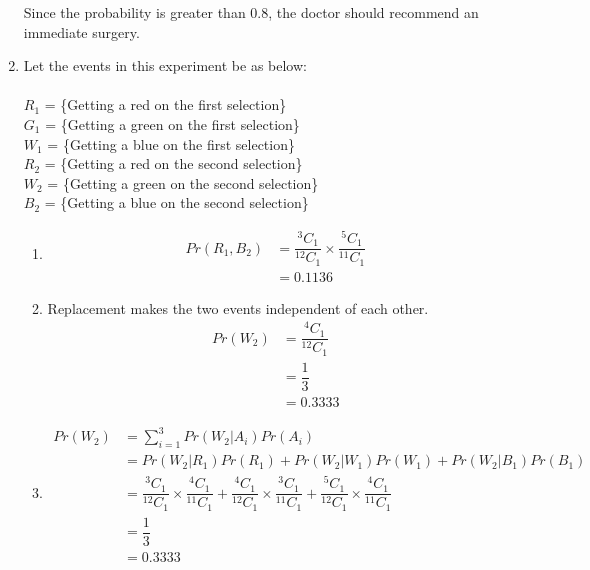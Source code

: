 \documentclass{article}
\begin{document}
\begin{enumerate}
		Since the probability is greater than 0.8, the doctor should recommend an immediate surgery.
		
		\newpage
		
		\item \large Let the events in this experiment be as below:
		\\\\
		$R_{1}$ = \{Getting a red on the first selection\}\\
		$G_{1}$ = \{Getting a green on the first selection\}\\
		$W_{1}$ = \{Getting a blue on the first selection\}\\
		$R_{2}$ = \{Getting a red on the second selection\}\\
		$W_{2}$ = \{Getting a green on the second selection\}\\
		$B_{2}$ = \{Getting a blue on the second selection\}
		\begin{enumerate}
			\item
			 \begin{align*}
			 	Pr(R_{1}, B_{2}) &= \dfrac{^{3}C_{1}}{^{12}C_{1}} \times \dfrac{^{5}C_{1}}{^{11}C_{1}}\\
			 	&= \mathbf{0.1136}
			 \end{align*}
			\item Replacement makes the two events independent of each other.
			\begin{align*}
				Pr(W_{2}) &= \dfrac{^{4}C_{1}}{^{12}C_{1}}\\
						  &= \dfrac{1}{3}\\
						  &= \mathbf{0.3333}
			\end{align*}
			\item 
			\begin{align*}
				Pr(W_{2}) &= \sum\limits_{i = 1}^{3} Pr(W_{2} | A_{i}) Pr(A_{i})\\
					  &= Pr(W_{2} | R_{1}) Pr(R_{1}) + Pr(W_{2} | W_{1}) Pr(W_{1}) + Pr(W_{2} | B_{1}) Pr(B_{1})\\
					  &= \dfrac{^{3}C_{1}}{^{12}C_{1}} \times \dfrac{^{4}C_{1}}{^{11}C_{1}} + \dfrac{^{4}C_{1}}{^{12}C_{1}} \times \dfrac{^{3}C_{1}}{^{11}C_{1}} + \dfrac{^{5}C_{1}}{^{12}C_{1}} \times \dfrac{^{4}C_{1}}{^{11}C_{1}}\\
					  &= \dfrac{1}{3}\\
					  &= \mathbf{0.3333}
			\end{align*}
		\end{enumerate}
		
		
		\newpage
		

\end{enumerate}
\end{document}
